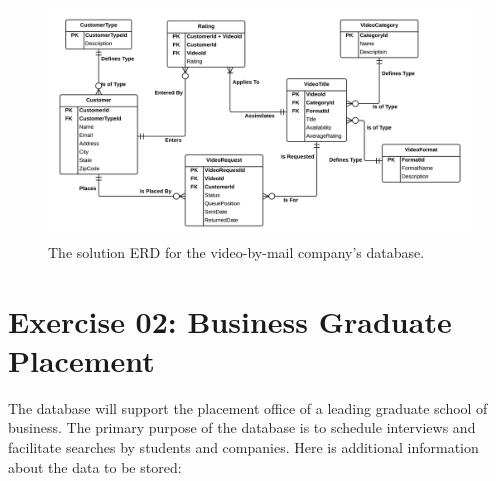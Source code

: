 \documentclass{article}
\begin{document}
  \begin{figure}[h]
    \centering
    \includegraphics[width=.95\linewidth]{HW07_Exercise01_ERD}
    \caption{The solution ERD for the video-by-mail company's database.}
    \label{fig:HW07_Ex01}
  \end{figure}
%
%
\newpage
\section{Exercise 02: Business Graduate Placement}

The database will support the placement office of a leading graduate school of business. The primary purpose of the database is to schedule interviews and facilitate searches by students and companies. Here is additional information about the data to be stored:
\end{document}
